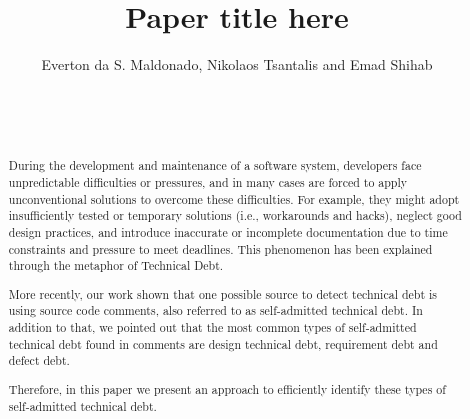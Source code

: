 \documentclass{sig-alternate}
\begin{document}

\title{Paper title here}

\author{
\alignauthor 
       Everton da S. Maldonado, Nikolaos Tsantalis and Emad Shihab\\
       \\
       \\
       \\
}


\maketitle
\begin{abstract}
During the development and maintenance of a software system, developers face unpredictable difficulties or pressures, and in many cases are forced to apply unconventional solutions to overcome these difficulties. For example, they might adopt insufficiently tested or temporary solutions (i.e., workarounds and hacks), neglect good design practices, and introduce inaccurate or incomplete documentation due to time constraints and pressure to meet deadlines. This phenomenon has been explained through the metaphor of Technical Debt. 

More recently, our work shown that one possible source to detect technical debt is using source code comments, also referred to as self-admitted technical debt. In addition to that, we pointed out that the most common types of self-admitted technical debt found in comments are design technical debt, requirement debt and defect debt. 

Therefore, in this paper we present an approach to efficiently identify these types of self-admitted technical debt. 



\end{abstract}
\end{document}
